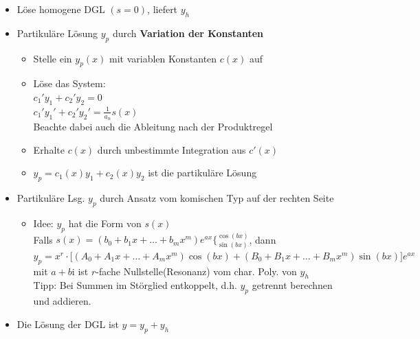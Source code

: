 \documentclass[6pt,a4paper]{scrartcl}
\renewcommand{\emph}[1]{\textbf{#1}}															%
\renewcommand{\i}{\ensuremath{\mathrm{i}}}										%
\begin{document}
\begin{multicols*}{4}
\begin{itemize}\itemsep0pt 
	\item Löse homogene DGL $(s = 0)$, liefert $y_h$
	\item Partikuläre Lösung $y_p$ durch \emph{Variation der Konstanten}
	\begin{itemize}\itemsep0pt 
		\item Stelle ein $y_p (x)$ mit variablen Konstanten $c(x)$ auf
		\item Löse das System: \\
		$c_1' y_1 + c_2' y_2 = 0$ \\
		$c_1' y_1' + c_2' y_2' = \frac{1}{a_n} s(x)$ \\
		Beachte dabei auch die Ableitung nach der Produktregel
		\item Erhalte $c(x)$ durch unbestimmte Integration aus $c'(x)$
		\item $y_p = c_1 (x) y_1 + c_2 (x) y_2$ ist die partikuläre Lösung
	\end{itemize}
	\item Partikuläre Lsg. $y_p$ durch Ansatz vom komischen Typ auf der rechten Seite
	\begin{itemize}\itemsep0pt 
		\item Idee: $y_p$ hat die Form von $s(x)$\\
		Falls $s(x) = (b_0 + b_1 x + \ldots + b_m x^m) e^{ax}  \Big\{ {}^{\textstyle \cos(bx)} _{\textstyle \sin(bx)}$, dann\\
		$y_p = x^r \cdot \big[ (A_0 + A_1 x + \ldots + A_m x^m) \cos(bx) + (B_0 + B_1 x + \ldots + B_m x^m) \sin(bx) \big] e^{ax}$ \\
		mit $a+b\i$ ist $r$-fache Nullstelle(Resonanz) vom char. Poly. von $y_h$ \\
		Tipp: Bei Summen im Störglied entkoppelt, d.h. $y_p$ getrennt berechnen und addieren.
	\end{itemize}
	\item Die Lösung der DGL ist $y = y_p + y_h$
\end{itemize}	


\end{multicols*}
\end{document}
